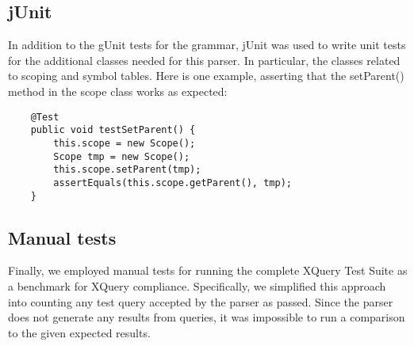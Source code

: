 \subsection{jUnit}
In addition to the gUnit tests for the grammar, jUnit was used to write unit tests for
the additional classes needed for this parser. In particular, the classes
related to scoping and symbol tables. Here is one example, asserting that the
setParent() method in the scope class works as expected:
\begin{verbatim}
    @Test
    public void testSetParent() {
        this.scope = new Scope();
        Scope tmp = new Scope();
        this.scope.setParent(tmp);
        assertEquals(this.scope.getParent(), tmp);
    }
\end{verbatim}

\subsection{Manual tests}
Finally, we employed manual tests for running the complete XQuery Test Suite\cite{w3c05}
as a benchmark for XQuery compliance. Specifically, we simplified this approach
into counting any test query accepted by the parser as passed. Since the parser
does not generate any results from queries, it was impossible to run a
comparison to the given expected results.